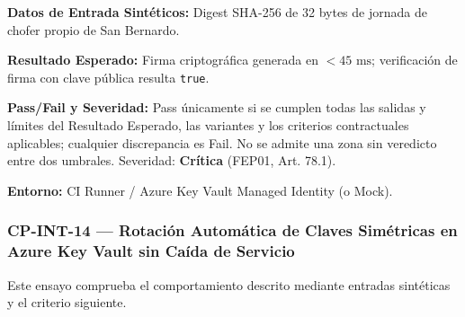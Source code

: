 \par\noindent\textbf{Datos de Entrada Sintéticos:} Digest SHA-256 de 32 bytes de jornada de chofer propio de San Bernardo.\par
\par\noindent\textbf{Resultado Esperado:} Firma criptográfica generada en \(< 45\text{ ms}\); verificación de firma con clave pública resulta \texttt{t\allowbreak{}r\allowbreak{}u\allowbreak{}e\allowbreak{}}.\par
\par\noindent\textbf{Pass/Fail y Severidad:} Pass únicamente si se cumplen todas las salidas y límites del Resultado Esperado, las variantes y los criterios contractuales aplicables; cualquier discrepancia es Fail. No se admite una zona sin veredicto entre dos umbrales. Severidad: \textbf{Crítica} (FEP01, Art. 78.1).\par
\par\noindent\textbf{Entorno:} CI Runner / Azure Key Vault Managed Identity (o Mock).\par






\subsubsection*{CP-INT-14 — Rotación Automática de Claves Simétricas en Azure Key Vault sin Caída de Servicio}\label{sec:9-cp-int-14}
Este ensayo comprueba el comportamiento descrito mediante entradas sintéticas y el criterio siguiente.

